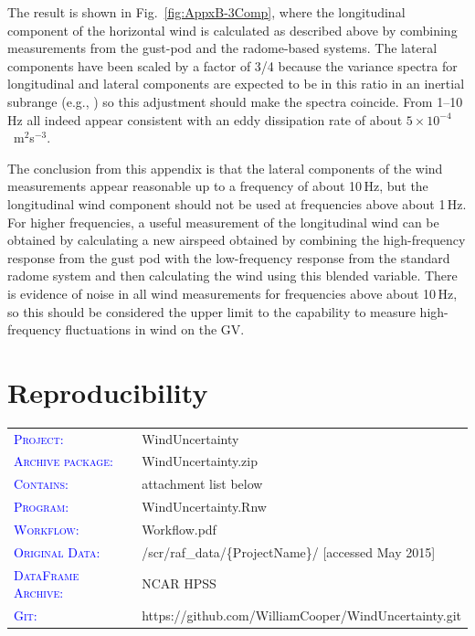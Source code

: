 \documentclass[12pt,twoside,english]{article}\usepackage[]{graphicx}\usepackage[]{color}
\providecommand{\tabularnewline}{\\}
\let\stdsection\section
\renewcommand{\section}{\newpage\stdsection}
\let\OrgIndex\index
\renewcommand*{\index}[1]{\OrgIndex{#1}}
\begin{document}
{{\begin{appendices}
The result is shown in Fig.~\ref{fig:AppxB-3Comp}, where the longitudinal component of the horizontal wind is calculated as described above by combining measurements from the gust-pod and the radome-based systems. The lateral components have been scaled by a factor of 3/4 because the variance spectra for longitudinal and lateral components are expected to be in this ratio in an inertial subrange (e.g., \citet{batchelor1953theory}) so this adjustment should make the spectra coincide. From 1--10\,Hz all indeed appear consistent with an eddy dissipation rate of about $5\times10^{-4}$~m$^{2}$s$^{-3}$. 

The conclusion from this appendix is that the lateral components of the wind measurements appear reasonable up to a frequency of about 10\,Hz, but the longitudinal wind component should not be used at frequencies above about 1\,Hz. For higher frequencies, a useful measurement of the longitudinal wind can be obtained by calculating a new airspeed obtained by combining the high-frequency response from the gust pod with the low-frequency response from the standard radome system and then calculating the wind using this blended variable. There is evidence of noise in all wind measurements for frequencies above about 10\,Hz, so this should be considered the upper limit to the capability to measure high-frequency fluctuations in wind on the GV. 



\section{Reproducibility}


\begin{tabular}{ll}
\textsf{\textsc{\textcolor{blue}{Project:}}} & WindUncertainty\tabularnewline
\textsf{\textsc{\textcolor{blue}{Archive package:}}} & WindUncertainty.zip\tabularnewline
\textsf{\textsc{\textcolor{blue}{Contains:}}} & attachment list below\tabularnewline
\textsf{\textsc{\textcolor{blue}{Program:}}} & WindUncertainty.Rnw\tabularnewline
\textsf{\textsc{\textcolor{blue}{Workflow:}}} & Workflow.pdf\tabularnewline
\textsf{\textsc{\textcolor{blue}{Original Data:}}} & /scr/raf\_data/\{ProjectName\}/ [accessed May 2015] \tabularnewline
\textsf{\textsc{\textcolor{blue}{DataFrame Archive:}}} & NCAR HPSS\tabularnewline
\textsf{\textsc{\textcolor{blue}{Git:}}} & https://github.com/WilliamCooper/WindUncertainty.git\tabularnewline
\end{tabular}


\end{appendices}}}
\end{document}
